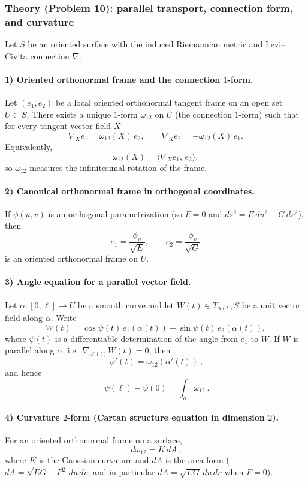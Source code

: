 \documentclass[12pt,a4paper]{article}
\theoremstyle{plain}
\theoremstyle{definition}      %
\begin{document}
\subsubsection*{Theory (Problem 10): parallel transport, connection form, and curvature}

Let $S$ be an oriented surface with the induced Riemannian metric and Levi--Civita connection $\nabla$.

\paragraph{1) Oriented orthonormal frame and the connection $1$-form.}
Let $(e_1,e_2)$ be a local oriented orthonormal tangent frame on an open set $U\subset S$.
There exists a unique $1$-form $\omega_{12}$ on $U$ (the connection $1$-form) such that for every tangent vector field $X$
\[
\nabla_X e_1=\omega_{12}(X)\,e_2,
\qquad
\nabla_X e_2=-\omega_{12}(X)\,e_1.
\]
Equivalently,
\[
\omega_{12}(X)=\langle \nabla_X e_1,\,e_2\rangle,
\]
so $\omega_{12}$ measures the infinitesimal rotation of the frame.

\paragraph{2) Canonical orthonormal frame in orthogonal coordinates.}
If $\phi(u,v)$ is an orthogonal parametrization (so $F=0$ and $ds^2=E\,du^2+G\,dv^2$), then
\[
e_1=\frac{\phi_u}{\sqrt{E}},
\qquad
e_2=\frac{\phi_v}{\sqrt{G}}
\]
is an oriented orthonormal frame on $U$.

\paragraph{3) Angle equation for a parallel vector field.}
Let $\alpha:[0,\ell]\to U$ be a smooth curve and let $W(t)\in T_{\alpha(t)}S$ be a unit vector field along $\alpha$.
Write
\[
W(t)=\cos\psi(t)\,e_1(\alpha(t))+\sin\psi(t)\,e_2(\alpha(t)),
\]
where $\psi(t)$ is a differentiable determination of the angle from $e_1$ to $W$.
If $W$ is parallel along $\alpha$, i.e.\ $\nabla_{\alpha'(t)}W(t)=0$, then
\[
\boxed{\ \psi'(t)=\omega_{12}(\alpha'(t))\ },
\]
and hence
\[
\boxed{\ \psi(\ell)-\psi(0)=\int_\alpha \omega_{12}\ }.
\]

\paragraph{4) Curvature $2$-form (Cartan structure equation in dimension $2$).}
For an oriented orthonormal frame on a surface,
\[
\boxed{\ d\omega_{12}=K\,dA\ },
\]
where $K$ is the Gaussian curvature and $dA$ is the area form
($dA=\sqrt{EG-F^2}\,du\,dv$, and in particular $dA=\sqrt{EG}\,du\,dv$ when $F=0$).
\end{document}
